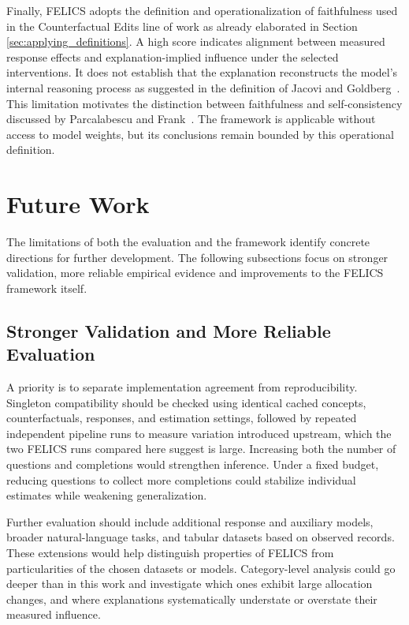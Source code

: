 Finally, FELICS adopts the definition and operationalization of faithfulness used in the Counterfactual Edits line of work as already elaborated in Section \ref{sec:applying_definitions}. A high score indicates alignment between measured response effects and explanation-implied influence under the selected interventions. It does not establish that the explanation reconstructs the model's internal reasoning process as suggested in the definition of Jacovi and Goldberg~\cite{jacoviFaithfullyInterpretableNLP2020}. This limitation motivates the distinction between faithfulness and self-consistency discussed by Parcalabescu and Frank~\cite{parcalabescuMeasuringFaithfulnessSelfconsistency2024}. The framework is applicable without access to model weights, but its conclusions remain bounded by this operational definition.

\section{Future Work}
\label{sec:future_work}

The limitations of both the evaluation and the framework identify concrete directions for further development. The following subsections focus on stronger validation, more reliable empirical evidence and improvements to the FELICS framework itself.

\subsection{Stronger Validation and More Reliable Evaluation}

A priority is to separate implementation agreement from reproducibility. Singleton compatibility should be checked using identical cached concepts, counterfactuals, responses, and estimation settings, followed by repeated independent pipeline runs to measure variation introduced upstream, which the two FELICS runs compared here suggest is large. Increasing both the number of questions and completions would strengthen inference. Under a fixed budget, reducing questions to collect more completions could stabilize individual estimates while weakening generalization.

Further evaluation should include additional response and auxiliary models, broader natural-language tasks, and tabular datasets based on observed records. These extensions would help distinguish properties of FELICS from particularities of the chosen datasets or models. Category-level analysis could go deeper than in this work and investigate which ones exhibit large allocation changes, and where explanations systematically understate or overstate their measured influence.

